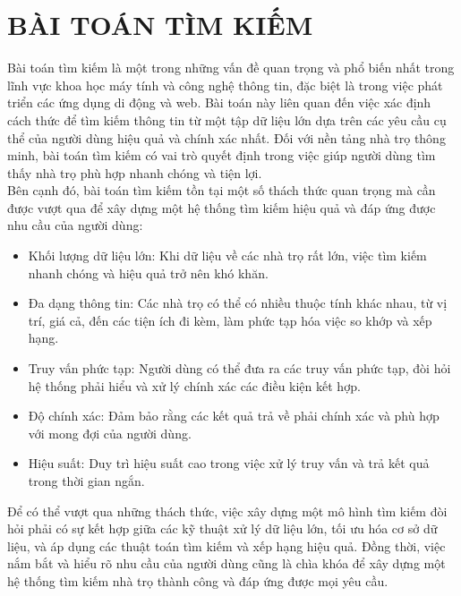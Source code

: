 \section{BÀI TOÁN TÌM KIẾM}
\hspace*{1cm}Bài toán tìm kiếm là một trong những vấn đề quan trọng và phổ biến nhất trong lĩnh vực khoa học máy tính và công nghệ thông tin, đặc biệt là trong việc phát triển các ứng dụng di động và web. Bài toán này liên quan đến việc xác định cách thức để tìm kiếm thông tin từ một tập dữ liệu lớn dựa trên các yêu cầu cụ thể của người dùng hiệu quả và chính xác nhất. Đối với nền tảng nhà trọ thông minh, bài toán tìm kiếm có vai trò quyết định trong việc giúp người dùng tìm thấy nhà trọ phù hợp nhanh chóng và tiện lợi.\\
\hspace*{1cm}Bên cạnh đó, bài toán tìm kiếm tồn tại một số thách thức quan trọng mà cần được vượt qua để xây dựng một hệ thống tìm kiếm hiệu quả và đáp ứng được nhu cầu của người dùng:
\begin{itemize}
    \item Khối lượng dữ liệu lớn: Khi dữ liệu về các nhà trọ rất lớn, việc tìm kiếm nhanh chóng và hiệu quả trở nên khó khăn.
    \item Đa dạng thông tin: Các nhà trọ có thể có nhiều thuộc tính khác nhau, từ vị trí, giá cả, đến các tiện ích đi kèm, làm phức tạp hóa việc so khớp và xếp hạng.
    \item Truy vấn phức tạp: Người dùng có thể đưa ra các truy vấn phức tạp, đòi hỏi hệ thống phải hiểu và xử lý chính xác các điều kiện kết hợp.
    \item Độ chính xác: Đảm bảo rằng các kết quả trả về phải chính xác và phù hợp với mong đợi của người dùng.
    \item Hiệu suất: Duy trì hiệu suất cao trong việc xử lý truy vấn và trả kết quả trong thời gian ngắn.
\end{itemize}

\hspace*{1cm}Để có thể vượt qua những thách thức, việc xây dựng một mô hình tìm kiếm đòi hỏi phải có sự kết hợp giữa các kỹ thuật xử lý dữ liệu lớn, tối ưu hóa cơ sở dữ liệu, và áp dụng các thuật toán tìm kiếm và xếp hạng hiệu quả. Đồng thời, việc nắm bắt và hiểu rõ nhu cầu của người dùng cũng là chìa khóa để xây dựng một hệ thống tìm kiếm nhà trọ thành công và đáp ứng được mọi yêu cầu.